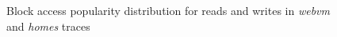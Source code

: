 \begin{figure}[t]
	\hfill
	\caption{Block access popularity distribution for reads and writes in 
	\textit{webvm} and \textit{homes} traces}
	\label{fig:webvm-blocks-read-write-distrib}
\end{figure}



